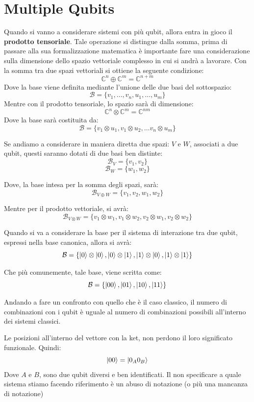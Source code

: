 \section{Multiple Qubits}
Quando si vanno a considerare sistemi con più qubit, allora entra in gioco il \textbf{prodotto tensoriale}.
Tale operazione si distingue dalla somma, prima di passare alla sua formalizzazione matematica è importante fare una considerazione sulla dimensione dello spazio vettoriale complesso in cui si andrà a lavorare. Con la somma tra due spazi vettoriali si ottiene la seguente condizione:
\[
\mathbb{C}^n \oplus \mathbb{C}^m = \mathbb{C}^{n+m}
\]
Dove la base viene definita mediante l'unione delle due basi del sottospazio:
\[
\mathcal{B} = \{v_1,\dots,v_n, u_1, \dots, u_m\}
\]
Mentre con il prodotto tensoriale, lo spazio sarà di dimensione:
\[
\mathbb{C}^n \otimes \mathbb{C}^m = \mathbb{C}^{nm}
\]
Dove la base sarà costituita da:
\[
\mathcal{B} = \{v_1 \otimes u_1, v_1 \otimes u_2, \dots v_n \otimes u_m\}
\]

Se andiamo a considerare in maniera diretta due spazi: \(V\) e \(W\), associati a due qubit, questi saranno dotati di due basi ben distinte:
\[
\mathcal{B}_V = \{v_1, v_2\}
\]
\[
\mathcal{B}_W = \{w_1, w_2\}
\]

Dove, la base intesa per la somma degli spazi, sarà:
\[
\mathcal{B}_{V \oplus W}= \{v_1,v_2,w_1,w_2\}
\]

Mentre per il prodotto vettoriale, si avrà:
\[
\mathcal{B}_{V \otimes W} = \{v_1 \otimes w_1, v_1 \otimes w_2, v_2 \otimes w_1, v_2 \otimes w_2 \}
\]

Quando si va a considerare la base per il sistema di interazione tra due qubit, espressi nella base canonica, allora si avrà:
\[
\mathcal{B} = \{\ket{0} \otimes \ket{0}, \ket{0} \otimes \ket{1}, \ket{1} \otimes \ket{0}, \ket{1} \otimes \ket{1}\}
\]

Che più comunemente, tale base, viene scritta come:
\[
\mathcal{B} = \{\ket{00}, \ket{01}, \ket{10}, \ket{11}\}
\]

Andando a fare un confronto con quello che è il caso classico, il numero di combinazioni con i qubit è uguale al numero di combinazioni possibili all'interno dei sistemi classici.

\begin{info}
Le posizioni all'interno del vettore con la ket, non perdono il loro significato funzionale. Quindi:
\[
\ket{00} = \ket{0_A 0_B}
\]
Dove \(A\) e \(B\), sono due qubit diversi e ben identificati. Il non specificare a quale sistema stiamo facendo riferimento è un abuso di notazione (o più una mancanza di notazione)
\end{info}

